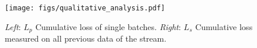 
\begin{figure}[t]
    \centering
    \texttt{[image: figs/qualitative\_analysis.pdf]}
    \caption{\textit{Left}: $L_p$ Cumulative loss of single batches. \textit{Right}: $L_s$ Cumulative loss measured on all previous data of the stream.}
    \label{fig:qualitative}
\end{figure}



